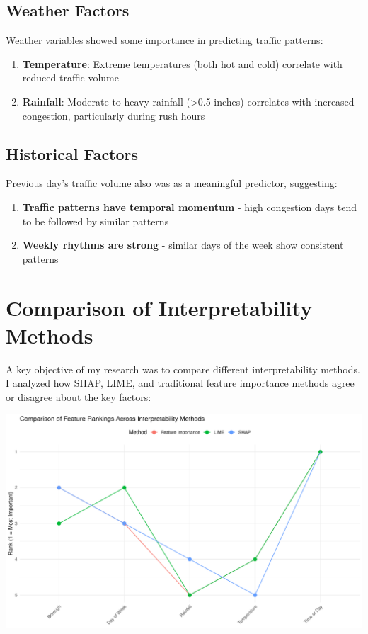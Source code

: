 \documentclass[
  letterpaper,
  DIV=11,
  numbers=noendperiod]{scrreprt}
\providecommand{\tightlist}{%
  \setlength{\itemsep}{0pt}\setlength{\parskip}{0pt}}\usepackage{longtable,booktabs,array}
\begin{document}
\subsection{Weather Factors}\label{weather-factors}

Weather variables showed some importance in predicting traffic patterns:

\begin{enumerate}
\def\labelenumi{\arabic{enumi}.}
\tightlist
\item
  \textbf{Temperature}: Extreme temperatures (both hot and cold)
  correlate with reduced traffic volume
\item
  \textbf{Rainfall}: Moderate to heavy rainfall (\textgreater0.5 inches)
  correlates with increased congestion, particularly during rush hours
\end{enumerate}

\subsection{Historical Factors}\label{historical-factors}

Previous day's traffic volume also was as a meaningful predictor,
suggesting:

\begin{enumerate}
\def\labelenumi{\arabic{enumi}.}
\tightlist
\item
  \textbf{Traffic patterns have temporal momentum} - high congestion
  days tend to be followed by similar patterns
\item
  \textbf{Weekly rhythms are strong} - similar days of the week show
  consistent patterns
\end{enumerate}

\section{Comparison of Interpretability
Methods}\label{comparison-of-interpretability-methods}

A key objective of my research was to compare different interpretability
methods. I analyzed how SHAP, LIME, and traditional feature importance
methods agree or disagree about the key factors:

\includegraphics[width=1\textwidth,height=\textheight]{figures/method-comparison-1.pdf}
\end{document}
